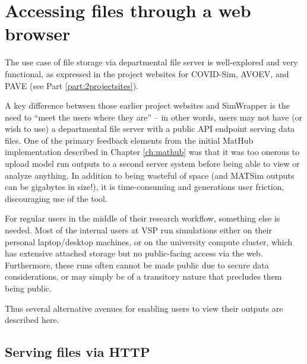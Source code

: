 
\hypertarget{simwrapper-accessing-files-through-a-web-browser}{%
\section{Accessing files through a web browser}
\label{simwrapper-accessing-files-through-a-web-browser}}

The use case of file storage via departmental file server is well-explored and very functional, as expressed in the project websites for COVID-Sim, AVOEV, and PAVE (see Part \ref{part:2projectsites}).

A key difference between those earlier project websites and SimWrapper is the need to ``meet the users where they are'' -- in other words, users may not have (or wish to use) a departmental file server with a public API endpoint serving data files. One of the primary feedback elements from the initial MatHub implementation described in Chapter \ref{ch:mathub} was that it was too onerous to upload model run outputs to a second server system before being able to view or analyze anything. In addition to being wasteful of space (and MATSim outputs can be gigabytes in size!), it is time-consuming and generations user friction, discouraging use of the tool.

For regular users in the middle of their research workflow, something else is needed. Most of the internal users at VSP run simulations either on their personal laptop/desktop machines, or on the university compute cluster, which has extensive attached storage but no public-facing access via the web. Furthermore, these runs often cannot be made public due to secure data considerations, or may simply be of a transitory nature that precludes them being public.

Thus several alternative avenues for enabling users to view their outputs are described here.


\hypertarget{simwrapper-how-simwrapper-access-files-via-http}{%
\subsection{Serving files via HTTP}
\label{simwrapper-how-simwrapper-access-files-via-http}}

